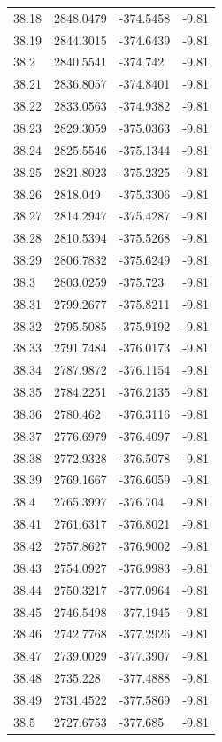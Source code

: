 \begin{table}[H]
\begin{tabular}{llll}
38.18 & 2848.0479 & -374.5458 & -9.81 \\
38.19 & 2844.3015 & -374.6439 & -9.81 \\
38.2 & 2840.5541 & -374.742 & -9.81 \\
38.21 & 2836.8057 & -374.8401 & -9.81 \\
38.22 & 2833.0563 & -374.9382 & -9.81 \\
38.23 & 2829.3059 & -375.0363 & -9.81 \\
38.24 & 2825.5546 & -375.1344 & -9.81 \\
38.25 & 2821.8023 & -375.2325 & -9.81 \\
38.26 & 2818.049 & -375.3306 & -9.81 \\
38.27 & 2814.2947 & -375.4287 & -9.81 \\
38.28 & 2810.5394 & -375.5268 & -9.81 \\
38.29 & 2806.7832 & -375.6249 & -9.81 \\
38.3 & 2803.0259 & -375.723 & -9.81 \\
38.31 & 2799.2677 & -375.8211 & -9.81 \\
38.32 & 2795.5085 & -375.9192 & -9.81 \\
38.33 & 2791.7484 & -376.0173 & -9.81 \\
38.34 & 2787.9872 & -376.1154 & -9.81 \\
38.35 & 2784.2251 & -376.2135 & -9.81 \\
38.36 & 2780.462 & -376.3116 & -9.81 \\
38.37 & 2776.6979 & -376.4097 & -9.81 \\
38.38 & 2772.9328 & -376.5078 & -9.81 \\
38.39 & 2769.1667 & -376.6059 & -9.81 \\
38.4 & 2765.3997 & -376.704 & -9.81 \\
38.41 & 2761.6317 & -376.8021 & -9.81 \\
38.42 & 2757.8627 & -376.9002 & -9.81 \\
38.43 & 2754.0927 & -376.9983 & -9.81 \\
38.44 & 2750.3217 & -377.0964 & -9.81 \\
38.45 & 2746.5498 & -377.1945 & -9.81 \\
38.46 & 2742.7768 & -377.2926 & -9.81 \\
38.47 & 2739.0029 & -377.3907 & -9.81 \\
38.48 & 2735.228 & -377.4888 & -9.81 \\
38.49 & 2731.4522 & -377.5869 & -9.81 \\
38.5 & 2727.6753 & -377.685 & -9.81 \\

\end{tabular}
\end{table}
